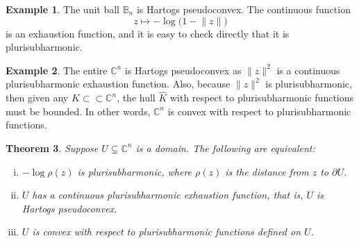 \documentclass[12pt,openany]{book}
\newcommand{\snorm}[1]{\lVert {#1} \rVert}
\newcommand{\C}{{\mathbb{C}}}
\newcommand{\bB}{{\mathbb{B}}}
\theoremstyle{plain}
\newtheorem{thm}{Theorem}[section]
\theoremstyle{remark}
\theoremstyle{definition}
\theoremstyle{exercise}
\theoremstyle{example}
\newtheorem{example}[thm]{Example}
\begin{document}
\begin{example}
The unit ball $\bB_n$ is Hartogs pseudoconvex.  The continuous
function
\begin{equation*}
z \mapsto - \log \bigl( 1-\snorm{z} \bigr)
\end{equation*}
is an exhaustion function, and it is easy to
check directly that it is plurisubharmonic.
\end{example}

\begin{example}
The entire $\C^n$ is Hartogs pseudoconvex as $\snorm{z}^2$ is
a continuous plurisubharmonic exhaustion function.
Also, because $\snorm{z}^2$ is plurisubharmonic, then given any $K \subset \subset
\C^n$, the hull $\widehat{K}$ with respect to plurisubharmonic functions must
be bounded.  In other words, $\C^n$ is convex with respect to
plurisubharmonic functions.
\end{example}

\begin{samepage}
\begin{thm}
Suppose $U \subsetneq \C^n$ is a domain.  The following are equivalent:
\begin{enumerate}[(i)]
\item \label{thm:pscvx:itemi}
$-\log \rho(z)$ is plurisubharmonic, where $\rho(z)$ is the distance from $z$
to $\partial U$.
\item \label{thm:pscvx:itemii}
$U$ has a continuous plurisubharmonic exhaustion function,
that is, $U$ is Hartogs pseudoconvex.
\item \label{thm:pscvx:itemiii}
$U$ is convex with respect to plurisubharmonic functions defined on $U$.
\end{enumerate}
\end{thm}
\end{samepage}
\end{document}
